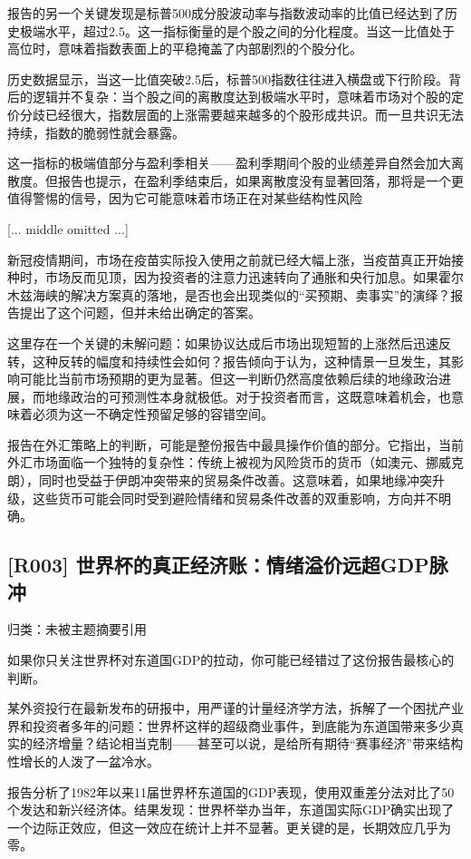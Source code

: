 \documentclass[11pt]{ctexart}
\begin{document}
报告的另一个关键发现是标普500成分股波动率与指数波动率的比值已经达到了历史极端水平，超过2.5。这一指标衡量的是个股之间的分化程度。当这一比值处于高位时，意味着指数表面上的平稳掩盖了内部剧烈的个股分化。

历史数据显示，当这一比值突破2.5后，标普500指数往往进入横盘或下行阶段。背后的逻辑并不复杂：当个股之间的离散度达到极端水平时，意味着市场对个股的定价分歧已经很大，指数层面的上涨需要越来越多的个股形成共识。而一旦共识无法持续，指数的脆弱性就会暴露。

这一指标的极端值部分与盈利季相关——盈利季期间个股的业绩差异自然会加大离散度。但报告也提示，在盈利季结束后，如果离散度没有显著回落，那将是一个更值得警惕的信号，因为它可能意味着市场正在对某些结构性风险

[... middle omitted ...]

新冠疫情期间，市场在疫苗实际投入使用之前就已经大幅上涨，当疫苗真正开始接种时，市场反而见顶，因为投资者的注意力迅速转向了通胀和央行加息。如果霍尔木兹海峡的解决方案真的落地，是否也会出现类似的“买预期、卖事实”的演绎？报告提出了这个问题，但并未给出确定的答案。

这里存在一个关键的未解问题：如果协议达成后市场出现短暂的上涨然后迅速反转，这种反转的幅度和持续性会如何？报告倾向于认为，这种情景一旦发生，其影响可能比当前市场预期的更为显著。但这一判断仍然高度依赖后续的地缘政治进展，而地缘政治的可预测性本身就极低。对于投资者而言，这既意味着机会，也意味着必须为这一不确定性预留足够的容错空间。

报告在外汇策略上的判断，可能是整份报告中最具操作价值的部分。它指出，当前外汇市场面临一个独特的复杂性：传统上被视为风险货币的货币（如澳元、挪威克朗），同时也受益于伊朗冲突带来的贸易条件改善。这意味着，如果地缘冲突升级，这些货币可能会同时受到避险情绪和贸易条件改善的双重影响，方向并不明确。

\subsection{[R003] 世界杯的真正经济账：情绪溢价远超GDP脉冲}
{\small\color{refgray}归类：未被主题摘要引用}

如果你只关注世界杯对东道国GDP的拉动，你可能已经错过了这份报告最核心的判断。

某外资投行在最新发布的研报中，用严谨的计量经济学方法，拆解了一个困扰产业界和投资者多年的问题：世界杯这样的超级商业事件，到底能为东道国带来多少真实的经济增量？结论相当克制——甚至可以说，是给所有期待“赛事经济”带来结构性增长的人泼了一盆冷水。

报告分析了1982年以来11届世界杯东道国的GDP表现，使用双重差分法对比了50个发达和新兴经济体。结果发现：世界杯举办当年，东道国实际GDP确实出现了一个边际正效应，但这一效应在统计上并不显著。更关键的是，长期效应几乎为零。
\end{document}
